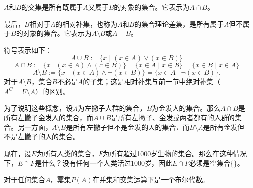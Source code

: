 $A$和$B$的交集是所有既属于$A$又属于$B$的对象的集合。它表示为$A \cap B$。

最后，$B$相对于$A$的相对补集，也称为$A$和$B$的集合理论差集，是所有属于$A$但不属于$B$的对象的集合。它表示为$A \setminus B$或$A - B$。

符号表示如下：
$$A \cup B := \{x \mid (x \in A) \vee (x \in B)\}~$$  
$$A \cap B := \{x \mid (x \in A) \wedge (x \in B)\} = \{x \in A \mid x \in B\} = \{x \in B \mid x \in A\}~$$ 
$$A \setminus B := \{x \mid (x \in A) \wedge \neg (x \in B)\} = \{x \in A \mid \neg (x \in B)\}.~$$
对于$A \setminus B$，集合$B$不必是$A$的子集；这是相对补集与前一节中绝对补集（$A^C = U \setminus A$）的区别。

为了说明这些概念，设$A$为左撇子人群的集合，$B$为金发人的集合。那么$A \cap B$是所有左撇子金发人的集合，而$A \cup B$是所有左撇子、金发或两者都有的人群的集合。另一方面，$A \setminus B$是所有左撇子但不是金发的人的集合，而$B \setminus A$是所有金发但不是左撇子的人的集合。

现在，设$E$为所有人类的集合，$F$为所有超过1000岁生物的集合。那么在这种情况下，$E \cap F$是什么？没有任何一个人类活过1000岁，因此$E \cap F$必须是空集合$\{\}$。

对于任何集合$A$，幂集$P(A)$在并集和交集运算下是一个布尔代数。
